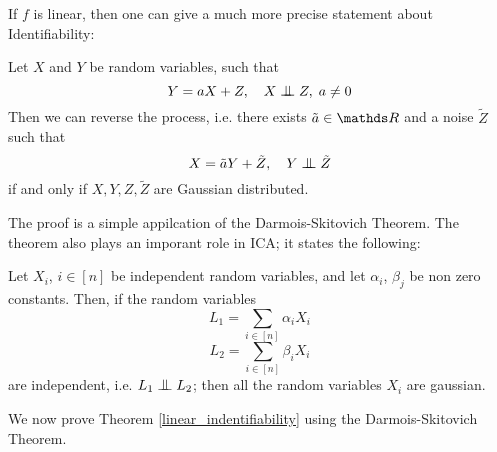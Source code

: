 If $f$ is linear, then one can give a much more precise statement about Identifiability:

\begin{theorem} Let $X$ and $Y$ be random variables, such that
$$
    Y = aX + Z, \quad X \bigCI Z, \; a \neq 0
$$
Then we can reverse the process, i.e. there exists $\tilde{a} \in \R$ and a noise $\tilde{Z}$ such that
$$
    X = \tilde{a}Y + \tilde{Z}, \quad Y \bigCI \tilde{Z}
$$
if and only if $X, Y, Z, \tilde{Z}$ are Gaussian distributed. 
\label{linear_indentifiability}
\end{theorem}

The proof is a simple appilcation of the Darmois-Skitovich Theorem. The theorem also plays an imporant role
in ICA; it states the following:

\begin{theorem} Let $X_i$, $i \in [n]$ be independent random variables, and let
    $\alpha_i$, $\beta_j$ be non zero constants. Then, if the random variables
    $$ 
        L_1 = \sum_{i \in [n]} \alpha_i X_i
    $$
    $$ 
        L_2 = \sum_{i \in [n]} \beta_i X_i
    $$
    are independent, i.e. $L_1 \bigCI L_2$; then all the random variables $X_i$ are gaussian. 
\end{theorem}

We now prove Theorem \ref{linear_indentifiability} using the Darmois-Skitovich Theorem.

